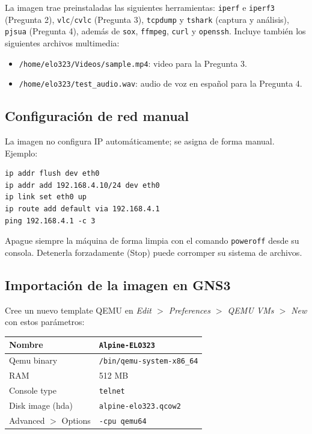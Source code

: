 \documentclass[letterpaper,12pt]{article}
\begin{document}
La imagen trae preinstaladas las siguientes herramientas: \texttt{iperf} e \texttt{iperf3} (Pregunta 2), \texttt{vlc}/\texttt{cvlc} (Pregunta 3), \texttt{tcpdump} y \texttt{tshark} (captura y análisis), \texttt{pjsua} (Pregunta 4), además de \texttt{sox}, \texttt{ffmpeg}, \texttt{curl} y \texttt{openssh}. Incluye también los siguientes archivos multimedia:

\begin{itemize}
    \item \texttt{/home/elo323/Videos/sample.mp4}: video para la Pregunta 3.
    \item \texttt{/home/elo323/test\_audio.wav}: audio de voz en español para la Pregunta 4.
\end{itemize}

\subsection{Configuración de red manual}

La imagen no configura IP automáticamente; se asigna de forma manual. Ejemplo:

\begin{lstlisting}
ip addr flush dev eth0
ip addr add 192.168.4.10/24 dev eth0
ip link set eth0 up
ip route add default via 192.168.4.1
ping 192.168.4.1 -c 3
\end{lstlisting}

\begin{nota}
Apague siempre la máquina de forma limpia con el comando \texttt{poweroff} desde su consola. Detenerla forzadamente (Stop) puede corromper su sistema de archivos.
\end{nota}

\subsection{Importación de la imagen en GNS3}

Cree un nuevo template QEMU en \textit{Edit $>$ Preferences $>$ QEMU VMs $>$ New} con estos parámetros:

\begin{center}
\begin{tabular}{|l|l|}
    \hline
    Nombre            & \texttt{Alpine-ELO323} \\ \hline
    Qemu binary       & \texttt{/bin/qemu-system-x86\_64} \\ \hline
    RAM               & 512 MB \\ \hline
    Console type      & \texttt{telnet} \\ \hline
    Disk image (hda)  & \texttt{alpine-elo323.qcow2} \\ \hline
    Advanced $>$ Options & \texttt{-cpu qemu64} \\ \hline
\end{tabular}
\end{center}
\end{document}

